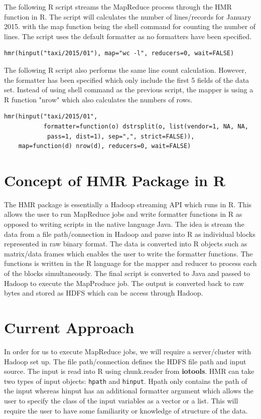 \documentclass[11pt]{book}
\newcommand{\code}[1]{\texttt{#1}}
\newcommand{\pkg}[1]{\textsf{ \bf #1}}
\begin{document}
The following R script streams the MapReduce process through the HMR function in R. The script will calculates the number of lines/records for January 2015. with the map function being the shell command for counting the number of lines. The script uses the default formatter as no formatters have been specified.

\begin{verbatim}
hmr(hinput("taxi/2015/01"), map="wc -l", reducers=0, wait=FALSE)
\end{verbatim}

The following R script also performs the same line count calculation. However, the formatter has been specified which only include the first 5 fields of the data set. Instead of using shell command as the previous script, the mapper is using a R function "nrow" which also calculates the numbers of rows.
 
\begin{verbatim}
hmr(hinput("taxi/2015/01",
           formatter=function(o) dstrsplit(o, list(vendor=1, NA, NA, 
           	pass=1, dist=1), sep=",", strict=FALSE)),
    map=function(d) nrow(d), reducers=0, wait=FALSE)
\end{verbatim}

\section{Concept of HMR Package in R}

The HMR package is essentially a Hadoop streaming API which runs in R. This allows the user to run MapReduce jobs and write formatter functions in R as opposed to writing scripts in the native language Java. The idea is stream the data from a file path/connection in Hadoop and parse into R as individual blocks represented in raw binary format. The data is converted into R objects such as matrix/data frames which enables the user to write the formatter functions. The functions is written in the R language for the mapper and reducer to process each of the blocks simultaneously. The final script is converted to Java and passed to Hadoop to execute the MapProduce job. The output is converted back to raw bytes and stored as HDFS which can be access through Hadoop.

\section{Current Approach}

In order for us to execute MapReduce jobs, we will require a server/cluster with Hadoop set up. The file path/connection defines the HDFS file path and input source. The input is read into R using chunk.reader from \pkg{iotools}. HMR can take two types of input objects: \code{hpath} and \code{hinput}. Hpath only contains the path of the input whereas hinput has an additional formatter argument which allows the user to specify the class of the input variables as a vector or a list. This will require the user to have some familiarity or knowledge of structure of the data. 
\end{document}
